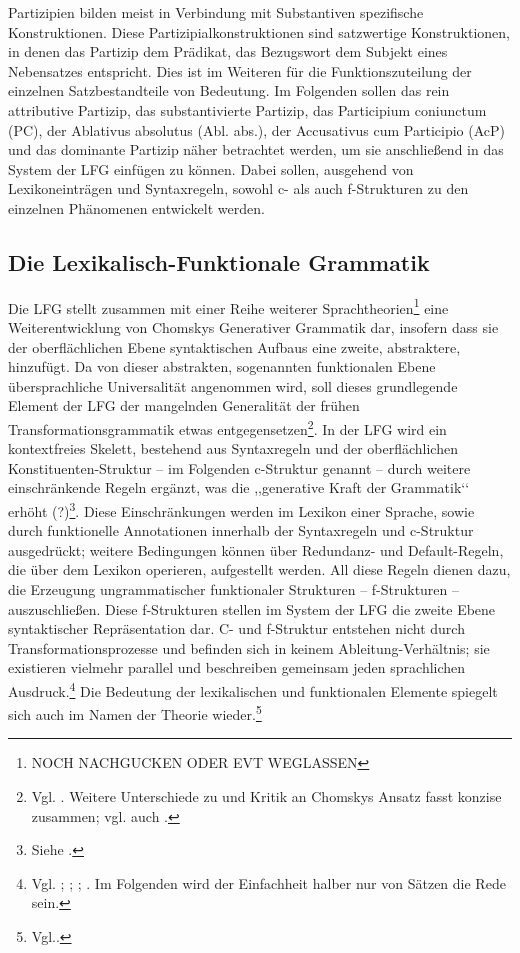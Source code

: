 \documentclass[12pt,a4paper]{article}
\begin{document}
Partizipien bilden meist in Verbindung mit Substantiven spezifische Konstruktionen. 
Diese Partizipialkonstruktionen sind satzwertige Konstruktionen, in denen das Partizip dem Prädikat, das Bezugswort dem Subjekt eines Nebensatzes entspricht. Dies ist im Weiteren für die Funktionszuteilung der einzelnen Satzbestandteile von Bedeutung.
Im Folgenden sollen das rein attributive Partizip, das substantivierte Partizip, das Participium coniunctum (PC), der Ablativus absolutus (Abl. abs.), der Accusativus cum Participio (AcP) und das dominante Partizip näher betrachtet werden, um sie anschließend in das System der LFG einfügen zu können. Dabei sollen, ausgehend von Lexikoneinträgen und Syntaxregeln, sowohl c- als auch f-Strukturen zu den einzelnen Phänomenen entwickelt werden.
\subsection{Die Lexikalisch-Funktionale Grammatik}
Die LFG stellt zusammen mit einer Reihe weiterer Sprachtheorien\footnote{NOCH NACHGUCKEN ODER EVT WEGLASSEN} eine Weiterentwicklung von Chomskys Generativer Grammatik dar, insofern dass sie der oberflächlichen Ebene syntaktischen Aufbaus eine zweite, abstraktere, hinzufügt. Da von dieser abstrakten, sogenannten funktionalen Ebene übersprachliche Universalität angenommen wird, soll dieses grundlegende Element der LFG der mangelnden Generalität der frühen Transformationsgrammatik etwas entgegensetzen\footnote{Vgl. \cite[1-3; 9]{Dal}. Weitere Unterschiede zu und Kritik an Chomskys Ansatz fasst \cite[11]{Rohrer} konzise zusammen; vgl. auch \cite[1; 3]{Dal}.}. In der LFG wird ein kontextfreies Skelett, bestehend aus Syntaxregeln und der oberflächlichen Konstituenten-Struktur – im Folgenden c-Struktur genannt --  durch weitere einschränkende Regeln ergänzt, was die ,,generative Kraft der Grammatik‘‘ erhöht (?)\footnote{Siehe \cite[9]{Rohrer}.}. Diese Einschränkungen werden im Lexikon einer Sprache, sowie durch funktionelle Annotationen innerhalb der Syntaxregeln und c-Struktur ausgedrückt; weitere Bedingungen können über Redundanz- und Default-Regeln, die über dem Lexikon operieren, aufgestellt werden. 
All diese Regeln dienen dazu, die Erzeugung ungrammatischer funktionaler Strukturen -- f-Strukturen -- auszuschließen. Diese f-Strukturen stellen im System der LFG die zweite Ebene syntaktischer Repräsentation dar. C- und f-Struktur entstehen nicht durch Transformationsprozesse und befinden sich in keinem Ableitung-Verhältnis; sie existieren vielmehr parallel und beschreiben gemeinsam jeden sprachlichen Ausdruck.\footnote{Vgl. \cite[64]{Falk}; \cite[8]{Skript}; \cite[2; 4; 7]{Dal}; \cite[11; 13]{Rohrer}. Im Folgenden wird der Einfachheit halber nur von Sätzen die Rede sein.} Die Bedeutung der lexikalischen und funktionalen Elemente spiegelt sich auch im Namen der Theorie wieder.\footnote{Vgl.\cite[3]{Dal}.}
\end{document}
